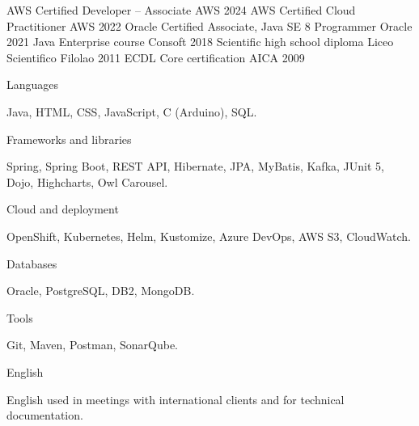 \documentclass[]{style}
\begin{document}
\begin{cvhonors}
	\cvhonor
	{AWS Certified Developer – Associate}
	{}
	{AWS}
	{2024}
	\cvhonor
	{AWS Certified Cloud Practitioner}
	{}
	{AWS}
	{2022}
	\cvhonor
	{Oracle Certified Associate, Java SE 8 Programmer}
	{}
	{Oracle}
	{2021}
	\cvhonor
	{Java Enterprise course}
	{}
	{Consoft}
	{2018}
	\cvhonor
	{Scientific high school diploma}
	{}
	{Liceo Scientifico Filolao}
	{2011}
	\cvhonor
	{ECDL Core certification}
	{}
	{AICA}
	{2009}
\end{cvhonors}

\begin{cventries}
	\cvskillentry
	{Languages}
	{\begin{cventryparagraph}
		\item {Java, HTML, CSS, JavaScript, C (Arduino), SQL.}
	\end{cventryparagraph}}
	
	\cvskillentry
	{Frameworks and libraries}
	{\begin{cventryparagraph}
		\item {Spring, Spring Boot, REST API, Hibernate, JPA, MyBatis, Kafka, JUnit 5, Dojo, Highcharts, Owl Carousel.}
	\end{cventryparagraph}}
	
	\cvskillentry
	{Cloud and deployment}
	{\begin{cventryparagraph}
		\item {OpenShift, Kubernetes, Helm, Kustomize, Azure DevOps, AWS S3, CloudWatch.}
	\end{cventryparagraph}}
	
	\cvskillentry
	{Databases}
	{\begin{cventryparagraph}
		\item {Oracle, PostgreSQL, DB2, MongoDB.}
	\end{cventryparagraph}}
	
	\cvskillentry
	{Tools}
	{\begin{cventryparagraph}
		\item {Git, Maven, Postman, SonarQube.}
	\end{cventryparagraph}}

	\cvskillentry
	{English}
	{\begin{cventryparagraph}
		\item {English used in meetings with international clients and for technical documentation.}
	\end{cventryparagraph}}
\end{cventries}
\end{document}
